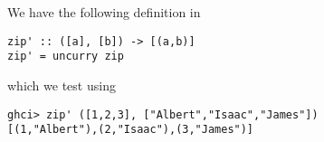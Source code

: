 
We have the following definition in 
\scriptsize\begin{verbatim}
zip' :: ([a], [b]) -> [(a,b)]
zip' = uncurry zip
\end{verbatim}\normalsize
which we test using
\scriptsize\begin{verbatim}
ghci> zip' ([1,2,3], ["Albert","Isaac","James"])
[(1,"Albert"),(2,"Isaac"),(3,"James")]
\end{verbatim}\normalsize
